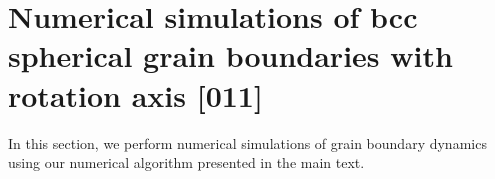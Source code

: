 \documentclass[smallextended]{svjour3}
\begin{document}
%




\section{Numerical simulations of bcc spherical grain boundaries with rotation axis [011]}\label{sec:nr}
In this section, we perform numerical simulations of grain boundary dynamics using our numerical algorithm presented in the main text.
\end{document}
